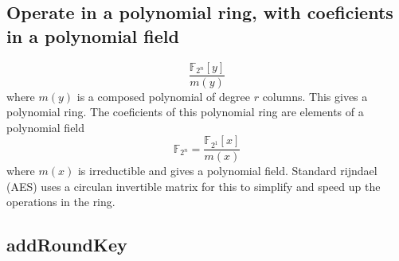 \documentclass[10pt,a4paper,twoside]{llncs}
\newcommand{\Fpn}[2]{\ensuremath{\mathbb{F}_{#1^#2}}}
\newcommand{\Fpnm}[2]{\ensuremath{\frac{\Fpn{2}{#1}[#2]}{m(#2)}}}
\begin{document}
\subsection{Operate in a polynomial ring, with coeficients in a polynomial field}
$$\Fpnm{n}{y}\label{eq:polynomialRing}$$ where $m(y)$ is a composed polynomial of degree $r$ columns. This gives a polynomial ring. The coeficients of this polynomial ring are elements of a polynomial field $$\Fpn{2}{n}=\Fpnm{1}{x}\label{eq:polynomialField}$$ where $m(x)$ is irreductible and gives a polynomial field.
Standard rijndael (AES) uses a circulan invertible matrix for this to simplify and speed up the operations in the ring.

\subsection{addRoundKey}
\end{document}
